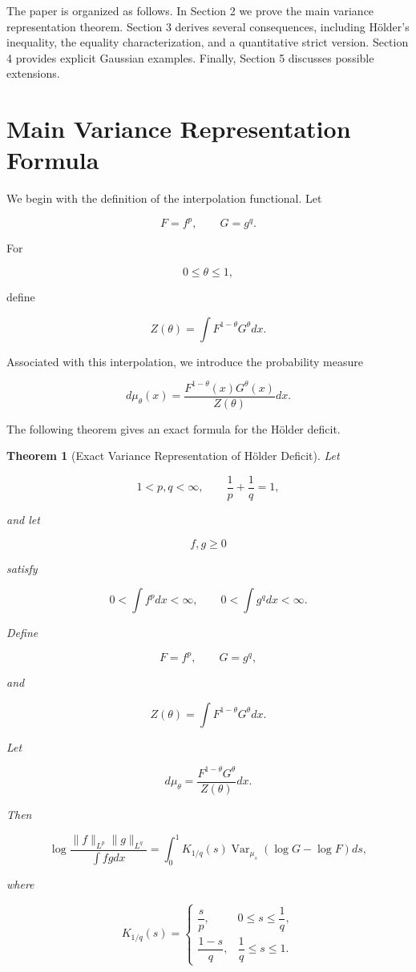 \documentclass[11pt]{amsart}
\newtheorem{theorem}{Theorem}[section]
\begin{document}
The paper is organized as follows. In Section 2 we prove the main
variance representation theorem. Section 3 derives several
consequences, including Hölder's inequality, the equality
characterization, and a quantitative strict version. Section 4
provides explicit Gaussian examples. Finally, Section 5 discusses
possible extensions.

\section{Main Variance Representation Formula}


We begin with the definition of the interpolation functional.
Let

\[
F=f^p,
\qquad
G=g^q .
\]

For

\[
0\leq \theta\leq 1,
\]

define

\[
Z(\theta)
=
\int
F^{1-\theta}G^\theta dx .
\]

Associated with this interpolation, we introduce the probability
measure

\[
d\mu_\theta(x)
=
\frac{
F^{1-\theta}(x)G^\theta(x)
}{
Z(\theta)
}
dx .
\]

The following theorem gives an exact formula for the Hölder deficit.


\begin{theorem}[Exact Variance Representation of Hölder Deficit]
Let

\[
1<p,q<\infty,
\qquad
\frac1p+\frac1q=1,
\]

and let

\[
f,g\geq0
\]

satisfy

\[
0<
\int f^p dx<\infty ,
\qquad
0<
\int g^q dx<\infty .
\]

Define

\[
F=f^p,
\qquad
G=g^q,
\]

and

\[
Z(\theta)
=
\int
F^{1-\theta}G^\theta dx .
\]

Let

\[
d\mu_\theta
=
\frac{
F^{1-\theta}G^\theta
}{
Z(\theta)
}
dx .
\]

Then

\[
\boxed{
\log
\frac{
\|f\|_{L^p}
\|g\|_{L^q}
}{
\int fg dx
}
=
\int_0^1
K_{1/q}(s)
\operatorname{Var}_{\mu_s}
\left(
\log G-\log F
\right)
ds ,
}
\]

where

\[
K_{1/q}(s)
=
\begin{cases}
\dfrac{s}{p},
&
0\leq s\leq\dfrac1q ,
\\[2ex]
\dfrac{1-s}{q},
&
\dfrac1q\leq s\leq1 .
\end{cases}
\]

\end{theorem}
\end{document}
